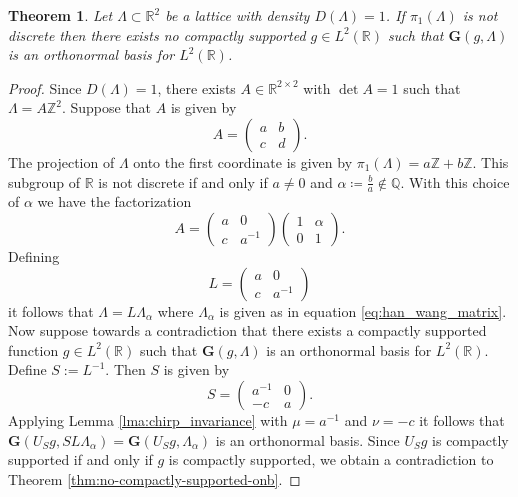 \documentclass[reqno,a4paper,12pt]{amsart}
\numberwithin{equation}{section}
\newtheorem{theorem}[definition]{Theorem}
\def\Z{{\mathbb Z}}
\def\R{{\mathbb R}}
\def\Q{{\mathbb Q}}
\newcommand{\lt}{{L^2(\R)}}
\newcommand\1{\mathds{1}}
\begin{document}
\begin{theorem}\label{thm:no_onb}
    Let $\Lambda \subset \R^2$ be a lattice with density $D(\Lambda)=1$. If $\pi_1(\Lambda)$ is not discrete then there exists no compactly supported $g \in \lt$ such that $\mathbf{G}(g,\Lambda)$ is an orthonormal basis for $\lt$.
\end{theorem}
\begin{proof}
    Since $D(\Lambda)=1$, there exists $A \in \R^{2\times 2}$ with $\det A=1$ such that $\Lambda = A\Z^2$. Suppose that $A$ is given by
    $$
    A = \begin{pmatrix}
        a & b \\ c & d
    \end{pmatrix}.
    $$
    The projection of $\Lambda$ onto the first coordinate is given by $\pi_1(\Lambda) = a \Z + b \Z$. This subgroup of $\R$ is not discrete if and only if $a \neq 0$ and $\alpha \coloneqq \frac{b}{a} \not\in \Q$. With this choice of $\alpha$ we have the factorization
    $$
    A = \begin{pmatrix}
        a & 0 \\ c & a^{-1}
    \end{pmatrix}
    \begin{pmatrix}
        1 & \alpha \\ 0 & 1
    \end{pmatrix}.
    $$
    Defining
    $$
    L = \begin{pmatrix}
        a & 0 \\ c & a^{-1}
    \end{pmatrix}
    $$
    it follows that $\Lambda = L \Lambda_\alpha$ where $\Lambda_\alpha$ is given as in equation \eqref{eq:han_wang_matrix}. Now suppose towards a contradiction that there exists a compactly supported function $g \in \lt$ such that $\mathbf{G}(g,\Lambda)$ is an orthonormal basis for $\lt$. Define $S := L^{-1}$. Then $S$ is given by
    $$
    S = \begin{pmatrix}
        a^{-1} & 0 \\ -c & a
    \end{pmatrix}.
    $$
    Applying Lemma \ref{lma:chirp_invariance} with $\mu = a^{-1}$ and $\nu = -c$ it follows that $\mathbf{G}(U_S g, SL\Lambda_\alpha) = \mathbf{G}(U_S g, \Lambda_\alpha)$ is an orthonormal basis. Since $U_S g$ is compactly supported if and only if $g$ is compactly supported, we obtain a contradiction to Theorem \ref{thm:no-compactly-supported-onb}.
\end{proof}
\end{document}
